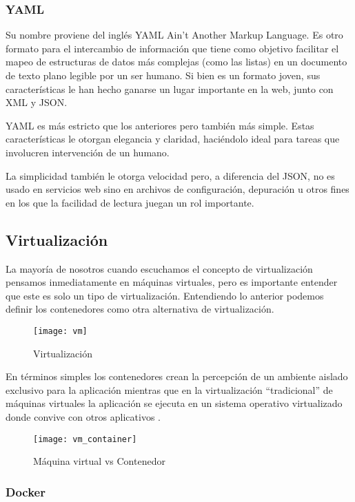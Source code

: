 \subsubsection{YAML}

Su nombre proviene del inglés YAML Ain’t Another Markup Language. Es otro formato para el intercambio de información que tiene como objetivo facilitar el mapeo de estructuras de datos más complejas (como las listas) en un documento de texto plano legible por un ser humano. Si bien es un formato joven, sus características le han hecho ganarse un lugar importante en la web, junto con XML y JSON.

YAML es más estricto que los anteriores pero también más simple. Estas características le otorgan elegancia y claridad, haciéndolo ideal para tareas que involucren intervención de un humano.

La simplicidad también le otorga velocidad pero, a diferencia del JSON, no es usado en servicios web sino en archivos de configuración, depuración u otros fines en los que la facilidad de lectura juegan un rol importante.

\subsection{Virtualización}

La mayoría de nosotros cuando escuchamos el concepto de virtualización pensamos inmediatamente en máquinas virtuales, pero es importante entender que este es solo un tipo de virtualización. Entendiendo lo anterior podemos definir los contenedores como otra alternativa de virtualización.

\begin{figure}[htp!]
  \centering
  \texttt{[image: vm]}
  \caption{Virtualización}
  \label{fig:vm}
\end{figure}

En términos simples los contenedores crean la percepción de un ambiente aislado exclusivo para la aplicación mientras que en la virtualización “tradicional” de máquinas virtuales la aplicación se ejecuta en un sistema operativo virtualizado donde convive con otros aplicativos \cite{docker1}.

\begin{figure}[htp!]
  \centering
  \texttt{[image: vm\_container]}
  \caption{Máquina virtual vs Contenedor}
  \label{fig:vm_container}
\end{figure}

\subsubsection{Docker}

